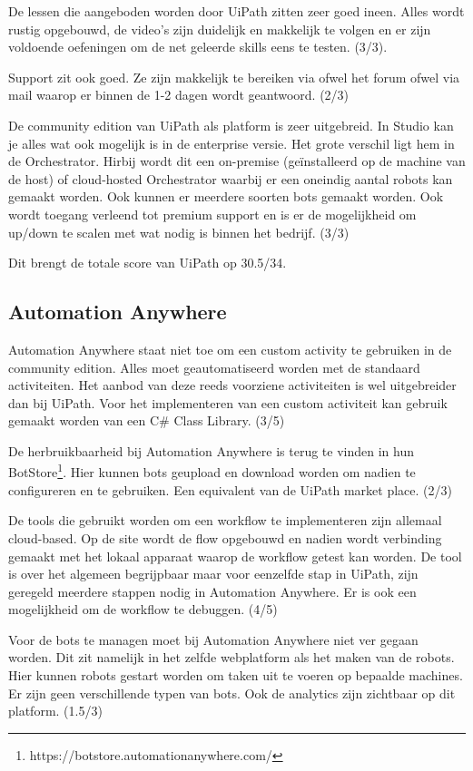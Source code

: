 De lessen die aangeboden worden door UiPath zitten zeer goed ineen. Alles wordt rustig opgebouwd, de video's zijn duidelijk en makkelijk te volgen en er zijn voldoende oefeningen om de net geleerde skills eens te testen. (3/3).

Support zit ook goed. Ze zijn makkelijk te bereiken via ofwel het forum ofwel via mail waarop er binnen de 1-2 dagen wordt geantwoord. (2/3)

De community edition van UiPath als platform is zeer uitgebreid. In Studio kan je alles wat ook mogelijk is in de enterprise versie. Het grote verschil ligt hem in de Orchestrator. Hirbij wordt dit een on-premise (geïnstalleerd op de machine van de host) of cloud-hosted Orchestrator waarbij er een oneindig aantal robots kan gemaakt worden. Ook kunnen er meerdere soorten bots gemaakt worden. Ook wordt toegang verleend tot premium support en is er de mogelijkheid om up/down te scalen met wat nodig is binnen het bedrijf. (3/3)

Dit brengt de totale score van UiPath op 30.5/34.

\subsection{Automation Anywhere}
Automation Anywhere staat niet toe om een custom activity te gebruiken in de community edition. Alles moet geautomatiseerd worden met de standaard activiteiten. Het aanbod van deze reeds voorziene activiteiten is wel uitgebreider dan bij UiPath. Voor het implementeren van een custom activiteit kan gebruik gemaakt worden van een C\# Class Library. (3/5)

De herbruikbaarheid bij Automation Anywhere is terug te vinden in hun BotStore\footnote{https://botstore.automationanywhere.com/}. Hier kunnen bots geupload en download worden om nadien te configureren en te gebruiken. Een equivalent van de UiPath market place. (2/3)

De tools die gebruikt worden om een workflow te implementeren zijn allemaal cloud-based. Op de site wordt de flow opgebouwd en nadien wordt verbinding gemaakt met het lokaal apparaat waarop de workflow getest kan worden. De tool is over het algemeen begrijpbaar maar voor eenzelfde stap in UiPath, zijn geregeld meerdere stappen nodig in Automation Anywhere. Er is ook een mogelijkheid om de workflow te debuggen. (4/5)

Voor de bots te managen moet bij Automation Anywhere niet ver gegaan worden. Dit zit namelijk in het zelfde webplatform als het maken van de robots. Hier kunnen robots gestart worden om taken uit te voeren op bepaalde machines. Er zijn geen verschillende typen van bots. Ook de analytics zijn zichtbaar op dit platform. (1.5/3)

